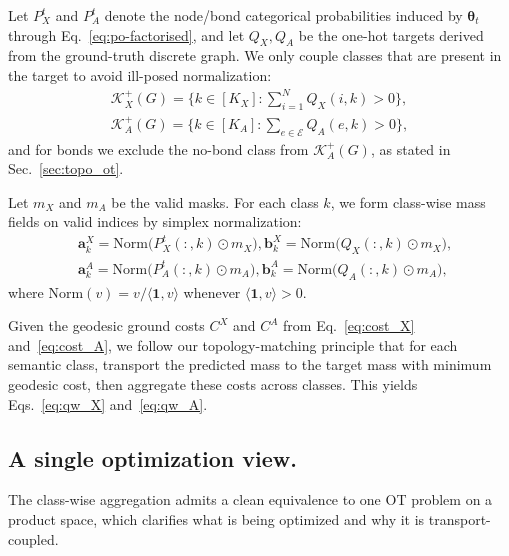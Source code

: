 Let $P_X^{t}$ and $P_A^{t}$ denote the node/bond
categorical probabilities induced by $\boldsymbol{\theta}_t$ through Eq.~\eqref{eq:po-factorised},
and let $Q_X,Q_A$ be the one-hot targets derived from the ground-truth discrete graph.
We only couple classes that are present in the target to avoid ill-posed normalization:
\begin{align}
\mathcal{K}_X^{+}(G)=\Big\{k\in[K_X]:\sum_{i=1}^{N} Q_X(i,k) > 0\Big\}, \\
\mathcal{K}_A^{+}(G)=\Big\{k\in[K_A]:\sum_{e\in\mathcal{E}} Q_A(e,k) > 0\Big\},
\end{align}
and for bonds we exclude the no-bond class from $\mathcal{K}_A^{+}(G)$, as stated in Sec.~\ref{sec:topo_ot}.

Let $m_X$ and $m_A$ be the valid masks.
For each class $k$, we form class-wise mass fields on valid indices by simplex normalization:
\begin{align}
&\mathbf{a}_k^{X}=\mathrm{Norm}\!\big(P_X^{t}(:,k)\odot m_X\big),
\mathbf{b}_k^{X}=\mathrm{Norm}\!\big(Q_X(:,k)\odot m_X\big),
\\
&\mathbf{a}_k^{A}=\mathrm{Norm}\!\big(P_A^{t}(:,k)\odot m_A\big),
\mathbf{b}_k^{A}=\mathrm{Norm}\!\big(Q_A(:,k)\odot m_A\big),
\end{align}
where $\mathrm{Norm}(v)=v/\langle \mathbf{1},v\rangle$ whenever $\langle \mathbf{1},v\rangle>0$.

Given the geodesic ground costs $C^X$ and $C^A$ from Eq.~\eqref{eq:cost_X} and~\eqref{eq:cost_A}, we follow our topology-matching principle that
for each semantic class, transport the predicted mass to the target mass with minimum geodesic cost,
then aggregate these costs across classes. This yields Eqs.~\eqref{eq:qw_X} and~\eqref{eq:qw_A}.

\subsection{A single optimization view.} The class-wise aggregation admits a clean equivalence to one OT problem on a product space, which clarifies what is being optimized and why it is transport-coupled.

